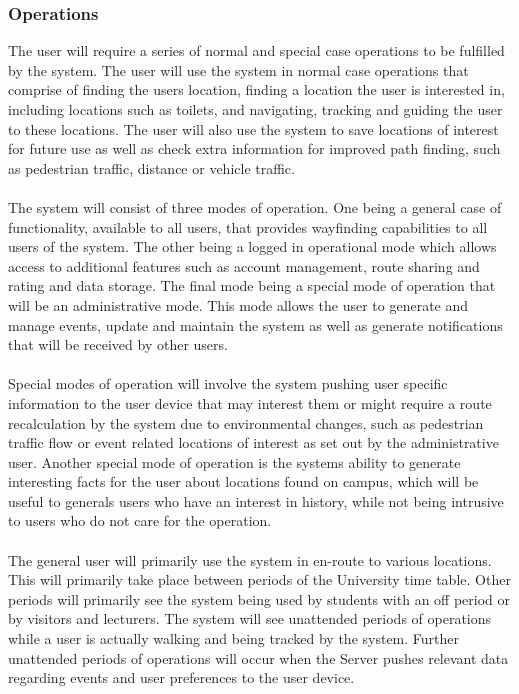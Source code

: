 \documentclass{article}
\begin{document}
            \subsubsection{Operations}
            	{The user will require a series of normal and special case operations to be fulfilled by the system. The user will use the system in normal case operations that comprise of finding the users location, finding a location the user is interested in, including locations such as toilets, and navigating, tracking and guiding the user to these locations. The user will also use the system to save locations of interest for future use as well as check extra information for improved path finding, such as pedestrian traffic, distance or vehicle traffic.\\\\
            	The system will consist of three modes of operation. One  being a general case of functionality, available to all users, that provides wayfinding capabilities to all users of the system. The other being a logged in operational mode which allows access to additional features such as account management, route sharing and rating and data storage. The final mode being a special mode of operation that will be an administrative mode. This mode allows the user to generate and manage events, update and maintain the system as well as generate notifications that will be received by other users.\\\\
            	Special modes of operation will involve the system pushing user specific information to the user device that may interest them or might require a route recalculation by the system due to environmental changes, such as pedestrian traffic flow or event related locations of interest as set out by the administrative user. Another special mode of operation is the systems ability to generate interesting facts for the user about locations found on campus, which will be useful to generals users who have an interest in history, while not being intrusive to users who do not care for the operation.\\\\
            	The general user will primarily use the system in en-route to various locations. This will primarily take place between periods of the University time table. Other periods will primarily see the system being used by students with an off period or by visitors and lecturers. The system will see unattended periods of operations while a user is actually walking and being tracked by the system. Further unattended periods of operations will occur when the Server pushes relevant data regarding events and user preferences to the user device.\\\\
}
\end{document}
